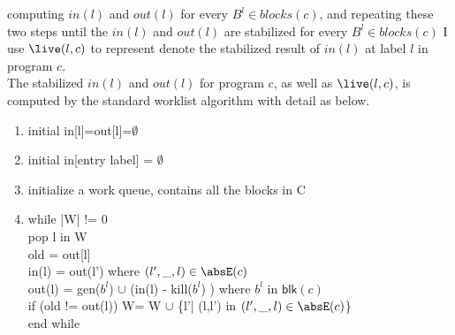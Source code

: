 computing $in(l)$ and $out(l)$ for every $B^l \in blocks(c) $, and repeating these two steps
until the $in(l)$ and $out(l)$ are stabilized for every $B^l \in blocks(c) $
 I use $\live(l,c)$ to represent 
denote the stabilized result of $in(l)$ at label $l$ in program $c$. 
\\
The stabilized $in(l)$ and $out(l)$ for program $c$, as well as $\live(l, c)$,
is computed by the standard worklist algorithm with detail as below. 
\begin{enumerate}
    \item initial in[l]=out[l]=$\emptyset$
    \item initial in[entry label] = $\emptyset$
    \item initialize a work queue, contains all the blocks in C
    \item while |W| != 0 \\
         pop l in W\\
          old = out[l]\\
          in(l) =  out(l') where $(l',\_, l) \in \absE(c)$\\
           out(l) = gen($b^l$) $\cup$ (in(l) - kill($b^l$) ) where $b^l$ in $\mathsf{blk}(c)$   \\
          if (old != out(l)) W= W $\cup$ \{l'| (l,l') in $(l',\_, l) \in \absE(c)$\}\\
          end while
\end{enumerate}
%

